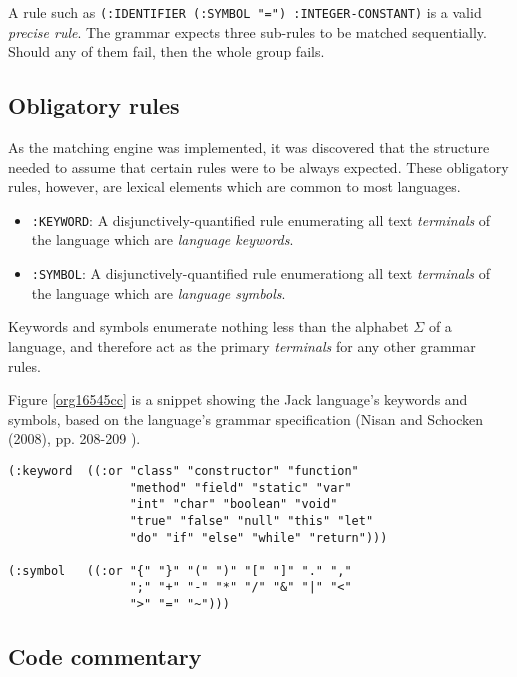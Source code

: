 \documentclass[a4paper,11pt,oneside]{article}
\begin{document}
A rule such as \texttt{(:IDENTIFIER (:SYMBOL "=") :INTEGER-CONSTANT)} is a
valid \emph{precise rule}. The grammar expects three sub-rules to be matched
sequentially. Should any of them fail, then the whole group fails.

\subsection*{Obligatory rules}
\label{sec:orge37a677}

As the matching engine was implemented, it was discovered that the
structure needed to assume that certain rules were to be
always expected. These obligatory rules, however, are lexical elements
which are common to most languages.

\begin{itemize}
\item \texttt{:KEYWORD}: A disjunctively-quantified rule enumerating all text
\emph{terminals} of the language which are \emph{language keywords}.
\item \texttt{:SYMBOL}: A disjunctively-quantified rule enumerationg all text
\emph{terminals} of the language which are \emph{language symbols}.
\end{itemize}

Keywords and symbols enumerate nothing less than the alphabet \(\Sigma\)
of a language, and therefore act as the primary \emph{terminals} for any
other grammar rules.

Figure \ref{org16545cc} is a snippet showing the Jack language's
keywords and symbols, based on the language's grammar specification
(Nisan and Schocken (2008), pp. 208-209 \cite{nand2tetris}).

\begin{verbatim}
(:keyword  ((:or "class" "constructor" "function"
                 "method" "field" "static" "var"
                 "int" "char" "boolean" "void"
                 "true" "false" "null" "this" "let"
                 "do" "if" "else" "while" "return")))

(:symbol   ((:or "{" "}" "(" ")" "[" "]" "." ","
                 ";" "+" "-" "*" "/" "&" "|" "<"
                 ">" "=" "~")))
\end{verbatim}

\subsection*{Code commentary}
\label{sec:org8db31ef}
\end{document}
